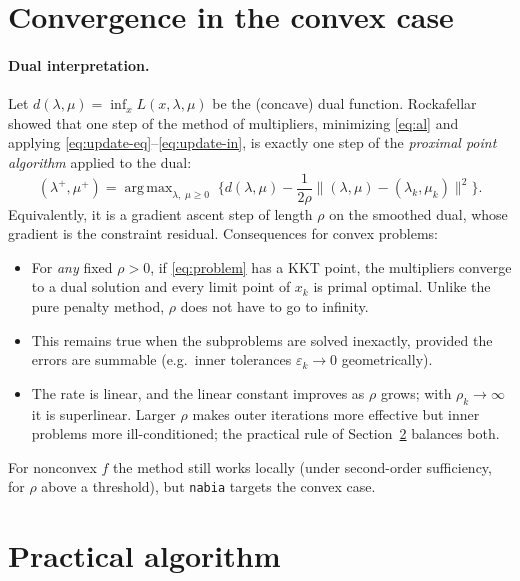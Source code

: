 \documentclass[11pt,a4paper]{article}
\newcommand{\norm}[1]{\lVert #1\rVert}
\DeclareMathOperator*{\argmax}{arg\,max}
\begin{document}
\section{Convergence in the convex case}

\paragraph{Dual interpretation.}
Let $d(\lambda,\mu)=\inf_x L(x,\lambda,\mu)$ be the (concave) dual function.
Rockafellar~\cite{rockafellar1976} showed that one step of the method of
multipliers, minimizing \eqref{eq:al} and applying
\eqref{eq:update-eq}--\eqref{eq:update-in}, is exactly one step of the
\emph{proximal point algorithm} applied to the dual:
\[
  (\lambda^+,\mu^+) = \argmax_{\lambda,\;\mu\ge 0}\;
    \Big\{ d(\lambda,\mu) - \frac{1}{2\rho}\norm{(\lambda,\mu)-(\lambda_k,\mu_k)}^2 \Big\}.
\]
Equivalently, it is a gradient ascent step of length $\rho$ on the smoothed dual,
whose gradient is the constraint residual. Consequences for convex problems:
\begin{itemize}
  \item For \emph{any} fixed $\rho>0$, if \eqref{eq:problem} has a KKT point, the
        multipliers converge to a dual solution and every limit point of
        $x_k$ is primal optimal. Unlike the pure penalty method, $\rho$ does not have to
        go to infinity.
  \item This remains true when the subproblems are solved inexactly, provided
        the errors are summable (e.g.\ inner tolerances $\varepsilon_k\to 0$
        geometrically).
  \item The rate is linear, and the linear constant improves as $\rho$ grows;
        with $\rho_k\to\infty$ it is superlinear. Larger $\rho$ makes outer
        iterations more effective but inner problems more ill-conditioned; the
        practical rule of Section~\ref{sec:practical} balances both.
\end{itemize}
For nonconvex $f$ the method still works locally (under second-order
sufficiency, for $\rho$ above a threshold), but \texttt{nabia} targets the
convex case.

\section{Practical algorithm}\label{sec:practical}
\end{document}
